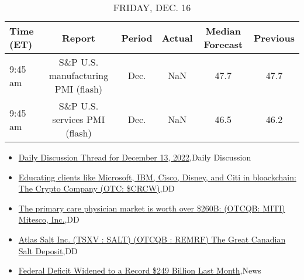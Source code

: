\documentclass{article}%
\begin{document}
%


\begin{table}[htbp]%
\caption{FRIDAY, DEC. 16}%
\centering%
\begin{adjustbox}{width=1\textwidth}%
\begin{tabular}{lccccc}
\toprule
Time (ET) &                             Report & Period & Actual & Median Forecast & Previous \\
\midrule
  9:45 am & S\&P U.S. manufacturing PMI (flash) &   Dec. &    NaN &            47.7 &     47.7 \\
  9:45 am &      S\&P U.S. services PMI (flash) &   Dec. &    NaN &            46.5 &     46.2 \\
\bottomrule
\end{tabular}
%
\end{adjustbox}%
\end{table}

%
\begin{itemize}%
\item%
\href{https://reddit.com/r/wallstreetbets/comments/zksyw8/daily\_discussion\_thread\_for\_december\_13\_2022/}{Daily Discussion Thread for December 13, 2022},Daily Discussion%
\item%
\href{https://reddit.com/r/Baystreetbets/comments/zklasi/educating\_clients\_like\_microsoft\_ibm\_cisco\_disney/}{Educating clients like Microsoft, IBM, Cisco, Disney, and Citi in bloackchain: The Crypto Company (OTC: \$CRCW)},DD%
\item%
\href{https://reddit.com/r/Baystreetbets/comments/zkkgrp/the\_primary\_care\_physician\_market\_is\_worth\_over/}{The primary care physician market is worth over \$260B: (OTCQB: MITI) Mitesco, Inc.},DD%
\item%
\href{https://reddit.com/r/Baystreetbets/comments/zk49fv/atlas\_salt\_inc\_tsxv\_salt\_otcqb\_remrf\_the\_great/}{Atlas Salt Inc. (TSXV : SALT) (OTCQB : REMRF) The Great Canadian Salt Deposit},DD%
\item%
\href{https://reddit.com/r/Economics/comments/zkt3ny/federal\_deficit\_widened\_to\_a\_record\_249\_billion/}{Federal Deficit Widened to a Record \$249 Billion Last Month},News%
\end{itemize}%
\end{document}
